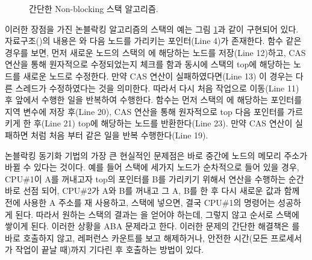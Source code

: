 \begin{figure}[h!]
\begin{center}
\inputminted[linenos,fontsize=\footnotesize,
tabsize=4]{c}{src/lockfree_stack.c}
\end{center}
\caption{간단한 Non-blocking 스택 알고리즘.}
\label{fig:nonblockingstack}
\end{figure}


이러한 장점을 가진 논블락킹 알고리즘의 스택의 예는 그림 \ref{fig:nonblockingstack}과 같이
구현되어 있다.
자료구조()의 내용은 와 다음 노드를 가리키는 포인터(Line 4)가 존재한다.
 함수 같은 경우를 보면, 먼저 새로운 노드의 스택의 에 해당하는 노드를 저장(Line 12)하고, 
CAS 연산을 통해 원자적으로 수정되었는지 체크를 함과 동시에 스택의 top에 해당하는 노드를 새로운 노드로 수정한다.
만약 CAS 연산이 실패하였다면(Line 13) 이 경우는 다른 스레드가 수정하였다는 것을 의미한다.
따라서 다시 처음 작업으로 이동(Line 11) 후 앞에서 수행한 일을 반복하여 수행한다.
 함수는 먼저 스택의 에 해당하는 포인터를 지역 변수에 저장 후(Line 20), CAS 연산을 통해 
원자적으로 top 다음 포인터를 가르키게 한 후(Line 21) top에 해당하는 노드를 반환한다(Line 23). 
만약 CAS 연산이 실패하면  처럼 처음 부터 같은 일을 반복 수행한다(Line 19).

논블락킹 동기화 기법의 가장 큰 현실적인 문제점은 바로 중간에 노드의 메모리 주소가 
바뀔 수 있다는 것이다. 
예를 들어 스택에 세가지 노드가 순차적으로 들어 있을 경우, 
CPU\#1이 A를 꺼내고자 top의 포인터를 B를 가리키기 위해서  연산을 
수행하는 순간 바로 선점 되어,  
CPU\#2가 A와 B를 꺼내고 그 A, B를 한 후 다시 새로운 값과 함께 전에 사용한 A 주소를 재 사용하고, 
스택에 넣으면, 결국 CPU\#1의  명령어는 성공하게 된다.
따라서 원하는 스택의 결과는 을 얻어야 하는데, 그렇지 않고  순서로 스택에 쌓이게
된다.
이러한 상황을 ABA 문제라고 한다. 
이러한 문제의 간단한 해결책은 를 바로 호출하지 않고, 레퍼런스 카운트를 보고 해제하거나, 
안전한 시간(모든 프로세서가 작업이 끝날 때)까지 기다린 후 호출하는 방법이 있다. 

